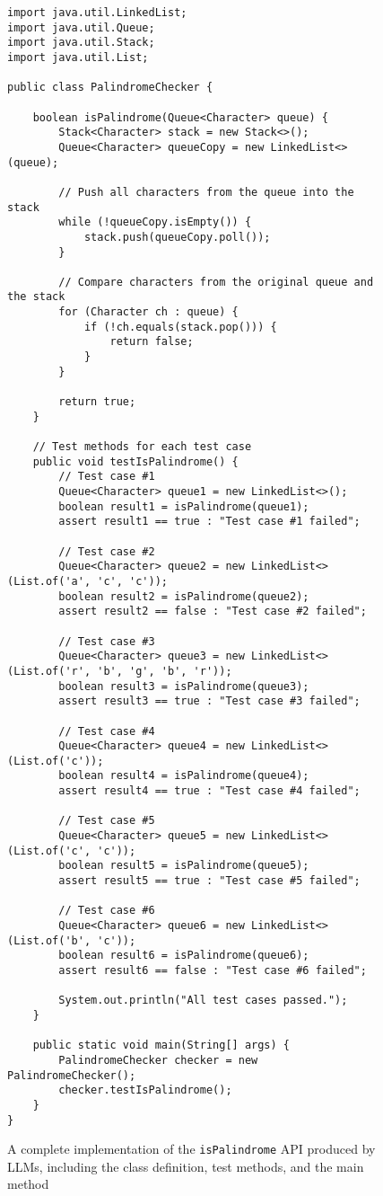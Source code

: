 \begin{figure}
	\centering
		\begin{lstlisting}[style = Java-github]
import java.util.LinkedList;
import java.util.Queue;
import java.util.Stack;
import java.util.List;

public class PalindromeChecker {

    boolean isPalindrome(Queue<Character> queue) {
        Stack<Character> stack = new Stack<>();
        Queue<Character> queueCopy = new LinkedList<>(queue);

        // Push all characters from the queue into the stack
        while (!queueCopy.isEmpty()) {
            stack.push(queueCopy.poll());
        }

        // Compare characters from the original queue and the stack
        for (Character ch : queue) {
            if (!ch.equals(stack.pop())) {
                return false;
            }
        }

        return true;
    }

    // Test methods for each test case
    public void testIsPalindrome() {
        // Test case #1
        Queue<Character> queue1 = new LinkedList<>();
        boolean result1 = isPalindrome(queue1);
        assert result1 == true : "Test case #1 failed";

        // Test case #2
        Queue<Character> queue2 = new LinkedList<>(List.of('a', 'c', 'c'));
        boolean result2 = isPalindrome(queue2);
        assert result2 == false : "Test case #2 failed";

        // Test case #3
        Queue<Character> queue3 = new LinkedList<>(List.of('r', 'b', 'g', 'b', 'r'));
        boolean result3 = isPalindrome(queue3);
        assert result3 == true : "Test case #3 failed";

        // Test case #4
        Queue<Character> queue4 = new LinkedList<>(List.of('c'));
        boolean result4 = isPalindrome(queue4);
        assert result4 == true : "Test case #4 failed";

        // Test case #5
        Queue<Character> queue5 = new LinkedList<>(List.of('c', 'c'));
        boolean result5 = isPalindrome(queue5);
        assert result5 == true : "Test case #5 failed";

        // Test case #6
        Queue<Character> queue6 = new LinkedList<>(List.of('b', 'c'));
        boolean result6 = isPalindrome(queue6);
        assert result6 == false : "Test case #6 failed";

        System.out.println("All test cases passed.");
    }

    public static void main(String[] args) {
        PalindromeChecker checker = new PalindromeChecker();
        checker.testIsPalindrome();
    }
}
            \end{lstlisting}

 \caption{A complete implementation of the \texttt{isPalindrome} API produced by LLMs, including the class definition, test methods, and the main method}
		\label{fig:figure5}
 
\end{figure}

